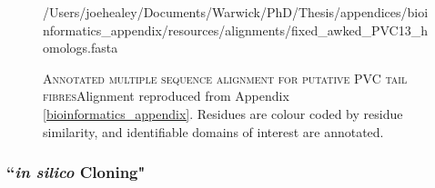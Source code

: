 \begin{figure}[p]

\vspace{-1cm}
\begin{texshade}{/Users/joehealey/Documents/Warwick/PhD/Thesis/appendices/bioinformatics_appendix/resources/alignments/fixed_awked_PVC13_homologs.fasta}

\smallblockskip
\hideruler
\vsepspace{0.2pt}
\hideconsensus
\topspace{-3.5pt}
\featuresfootnotesize
{}
%
%
\end{texshade}
	\captionsetup{singlelinecheck=off, justification=justified, font=footnotesize, aboveskip=2pt}
	\caption[Multiple Sequence Alignment of PVC Tail fibres]{\textsc{\normalsize Annotated multiple sequence alignment for putative PVC tail fibres}\vspace{0.1cm}\newline Alignment reproduced from Appendix \vref{bioinformatics_appendix}. Residues are colour coded by residue similarity, and identifiable domains of interest are annotated.}
	\label{tailfibremsa}
\end{figure}
\clearpage



\subsubsection{``\emph{in silico} Cloning"}


